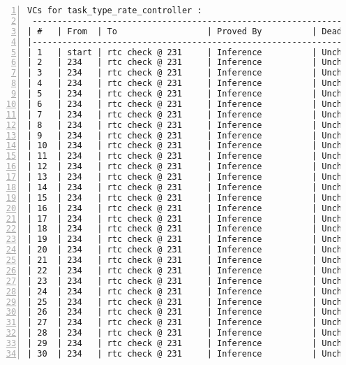 \begin{lstlisting}[gobble=0, numbers=left, caption={POGS report for PCA Pump prototype}, label={listing:pca_ravenscar:pogs_full}]
VCs for task_type_rate_controller :
 -----------------------------------------------------------------------------
| #   | From  | To                  | Proved By          | Dead Path | Status |
|-----------------------------------------------------------------------------
| 1   | start | rtc check @ 231     | Inference          | Unchecked |   IU   |
| 2   | 234   | rtc check @ 231     | Inference          | Unchecked |   IU   |
| 3   | 234   | rtc check @ 231     | Inference          | Unchecked |   IU   |
| 4   | 234   | rtc check @ 231     | Inference          | Unchecked |   IU   |
| 5   | 234   | rtc check @ 231     | Inference          | Unchecked |   IU   |
| 6   | 234   | rtc check @ 231     | Inference          | Unchecked |   IU   |
| 7   | 234   | rtc check @ 231     | Inference          | Unchecked |   IU   |
| 8   | 234   | rtc check @ 231     | Inference          | Unchecked |   IU   |
| 9   | 234   | rtc check @ 231     | Inference          | Unchecked |   IU   |
| 10  | 234   | rtc check @ 231     | Inference          | Unchecked |   IU   |
| 11  | 234   | rtc check @ 231     | Inference          | Unchecked |   IU   |
| 12  | 234   | rtc check @ 231     | Inference          | Unchecked |   IU   |
| 13  | 234   | rtc check @ 231     | Inference          | Unchecked |   IU   |
| 14  | 234   | rtc check @ 231     | Inference          | Unchecked |   IU   |
| 15  | 234   | rtc check @ 231     | Inference          | Unchecked |   IU   |
| 16  | 234   | rtc check @ 231     | Inference          | Unchecked |   IU   |
| 17  | 234   | rtc check @ 231     | Inference          | Unchecked |   IU   |
| 18  | 234   | rtc check @ 231     | Inference          | Unchecked |   IU   |
| 19  | 234   | rtc check @ 231     | Inference          | Unchecked |   IU   |
| 20  | 234   | rtc check @ 231     | Inference          | Unchecked |   IU   |
| 21  | 234   | rtc check @ 231     | Inference          | Unchecked |   IU   |
| 22  | 234   | rtc check @ 231     | Inference          | Unchecked |   IU   |
| 23  | 234   | rtc check @ 231     | Inference          | Unchecked |   IU   |
| 24  | 234   | rtc check @ 231     | Inference          | Unchecked |   IU   |
| 25  | 234   | rtc check @ 231     | Inference          | Unchecked |   IU   |
| 26  | 234   | rtc check @ 231     | Inference          | Unchecked |   IU   |
| 27  | 234   | rtc check @ 231     | Inference          | Unchecked |   IU   |
| 28  | 234   | rtc check @ 231     | Inference          | Unchecked |   IU   |
| 29  | 234   | rtc check @ 231     | Inference          | Unchecked |   IU   |
| 30  | 234   | rtc check @ 231     | Inference          | Unchecked |   IU   |

\end{lstlisting}

